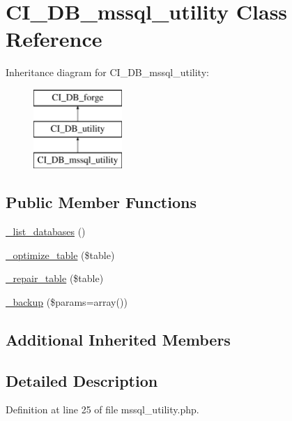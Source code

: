 \hypertarget{class_c_i___d_b__mssql__utility}{\section{C\-I\-\_\-\-D\-B\-\_\-mssql\-\_\-utility Class Reference}
\label{class_c_i___d_b__mssql__utility}
}
Inheritance diagram for C\-I\-\_\-\-D\-B\-\_\-mssql\-\_\-utility\-:\begin{figure}[H]
\begin{center}
\leavevmode
\includegraphics[height=3.000000cm]{class_c_i___d_b__mssql__utility}
\end{center}
\end{figure}
\subsection*{Public Member Functions}
\begin{DoxyCompactItemize}
\item 
\hyperlink{class_c_i___d_b__mssql__utility_aa047e69a7e732ca7280270f87f82bb3a}{\-\_\-list\-\_\-databases} ()
\item 
\hyperlink{class_c_i___d_b__mssql__utility_a4856292816fbbc8e9d927f565766727b}{\-\_\-optimize\-\_\-table} (\$table)
\item 
\hyperlink{class_c_i___d_b__mssql__utility_a7f40d4a3d78917e455e315cf708842ef}{\-\_\-repair\-\_\-table} (\$table)
\item 
\hyperlink{class_c_i___d_b__mssql__utility_a30f3053d2c82e7562349924363507afa}{\-\_\-backup} (\$params=array())
\end{DoxyCompactItemize}
\subsection*{Additional Inherited Members}


\subsection{Detailed Description}


Definition at line 25 of file mssql\-\_\-utility.\-php.



